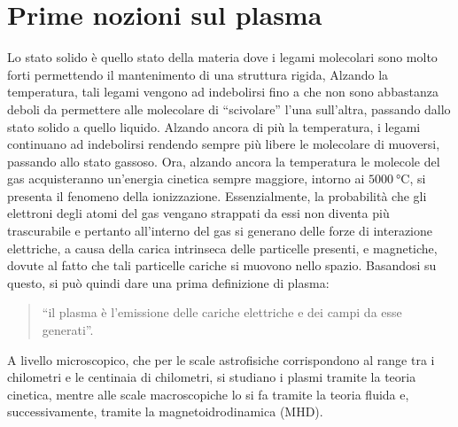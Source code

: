 \section{Prime nozioni sul plasma}
Lo stato solido è quello stato della materia dove i legami molecolari sono molto forti permettendo il mantenimento di una struttura rigida, Alzando la temperatura, tali legami vengono ad indebolirsi fino a che non sono abbastanza deboli da permettere alle molecolare di ``scivolare'' l'una sull'altra, passando dallo stato solido a quello liquido. Alzando ancora di più la temperatura, i legami continuano ad indebolirsi rendendo sempre più libere le molecolare di muoversi, passando allo stato gassoso. Ora, alzando ancora la temperatura le molecole del gas acquisteranno un'energia cinetica sempre maggiore, intorno ai $\SI{5000}{\celsius}$, si presenta il fenomeno della ionizzazione. Essenzialmente, la probabilità che gli elettroni degli atomi del gas vengano strappati da essi non diventa più trascurabile e pertanto all'interno del gas si generano delle forze di interazione elettriche, a causa della carica intrinseca delle particelle presenti, e magnetiche, dovute al fatto che tali particelle cariche si muovono nello spazio. Basandosi su questo, si può quindi dare una prima definizione di plasma:
\begin{quote}
    ``il plasma è l'emissione delle cariche elettriche e dei campi da esse generati''.
\end{quote}
A livello microscopico, che per le scale astrofisiche corrispondono al range tra i chilometri e le centinaia di chilometri, si studiano i plasmi tramite la teoria cinetica, mentre alle scale macroscopiche lo si fa tramite la teoria fluida e, successivamente, tramite la magnetoidrodinamica (MHD).

